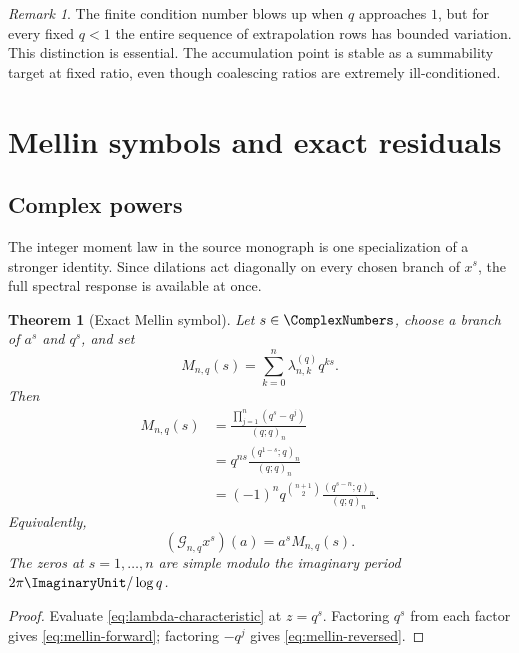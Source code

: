 \documentclass[11pt,a4paper,oneside]{article}
\newtheorem{theorem}{Theorem}[section]
\theoremstyle{definition}
\theoremstyle{remark}
\newtheorem{remark}[remark]{Remark}
\newcommand{\Gop}{\mathcal G}
\begin{document}
\begin{remark}
The finite condition number blows up when $q$ approaches $1$, but for every
fixed $q<1$ the entire sequence of extrapolation rows has bounded variation.
This distinction is essential.  The accumulation point is stable as a
summability target at fixed ratio, even though coalescing ratios are extremely
ill-conditioned.
\end{remark}

\section{Mellin symbols and exact residuals}
\label{sec:mellin}

\subsection{Complex powers}

The integer moment law in the source monograph is one specialization of a
stronger identity.  Since dilations act diagonally on every chosen branch of
$x^s$, the full spectral response is available at once.

\begin{theorem}[Exact Mellin symbol]
\label{thm:mellin-symbol}
Let $s\in\ComplexNumbers$, choose a branch of $a^s$ and $q^s$, and set
\begin{equation}
 M_{n,q}(s)=\sum_{k=0}^n\lambda_{n,k}^{(q)}q^{ks}.
 \label{eq:mellin-symbol-definition}
\end{equation}
Then
\begin{align}
 M_{n,q}(s)
 &=\frac{\prod_{j=1}^n(q^s-q^j)}{(q;q)_n}
 \label{eq:mellin-product}\\
 &=q^{ns}\frac{(q^{1-s};q)_n}{(q;q)_n}
 \label{eq:mellin-forward}\\
 &=(-1)^nq^{\binom{n+1}{2}}
   \frac{(q^{s-n};q)_n}{(q;q)_n}.
 \label{eq:mellin-reversed}
\end{align}
Equivalently,
\begin{equation}
 (\Gop_{n,q}x^s)(a)=a^sM_{n,q}(s).
 \label{eq:mellin-eigenvalue}
\end{equation}
The zeros at $s=1,\ldots,n$ are simple modulo the imaginary period
$2\pi\ImaginaryUnit/\log q$.
\end{theorem}

\begin{proof}
Evaluate \eqref{eq:lambda-characteristic} at $z=q^s$.  Factoring $q^s$ from
each factor gives \eqref{eq:mellin-forward}; factoring $-q^j$ gives
\eqref{eq:mellin-reversed}.
\end{proof}
\end{document}
